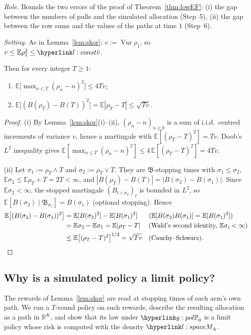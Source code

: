 \documentclass[11pt]{article}
\newcommand{\R}{\mathbb{R}}
\newcommand{\E}{\mathbb{E}}
\newcommand{\1}{\mathbf{1}}
\begin{document}
\begin{lemma}\label{lem:timechange}
\textit{Role.} Bounds the two errors of the proof of Theorem~\ref{thm:lowEF}: (i) the gap between the numbers of pulls and the simulated allocation (Step~5), (ii) the
gap between the row sums and the values of the paths at time $1$ (Step~6).

\noindent\textit{Setting.} As in Lemma~\ref{lem:skor}; $v:=\operatorname{Var}\rho_1$, so $v\le\E\rho_1^2\le\lvb$.

\noindent Then for every integer $T\ge1$:
\begin{enumerate}
\item[(i)] $\E\big[\max_{n\le T}(\rho_n-n)^2\big]\le4Tv$;
\item[(ii)] $\E\big[(B(\rho_T)-B(T))^2\big]=\E|\rho_T-T|\le\sqrt{Tv}$.
\end{enumerate}
\end{lemma}
\begin{proof}
(i) By Lemma~\ref{lem:skor}(i)--(ii), $(\rho_n-n)_{n\ge0}$ is a sum of i.i.d.\ centred increments of variance $v$, hence a martingale with $\E[(\rho_T-T)^2]=Tv$. Doob's
$L^2$ inequality gives $\E[\max_{n\le T}(\rho_n-n)^2]\le4\,\E[(\rho_T-T)^2]=4Tv$.

(ii) Let $\sigma_1:=\rho_T\wedge T$ and $\sigma_2:=\rho_T\vee T$. They are $\mathfrak B$-stopping times with $\sigma_1\le\sigma_2$, $\E\sigma_2\le\E\rho_T+T=2T<\infty$, and
$|B(\rho_T)-B(T)|=|B(\sigma_2)-B(\sigma_1)|$. Since $\E\sigma_2<\infty$, the stopped martingale $(B_{t\wedge\sigma_2})_t$ is bounded in $L^2$, so
$\E[B(\sigma_2)\mid\mathfrak B_{\sigma_1}]=B(\sigma_1)$ (optional stopping). Hence
\begin{align*}
\E\big[(B(\sigma_2)-B(\sigma_1))^2\big]&=\E[B(\sigma_2)^2]-\E[B(\sigma_1)^2] &&\text{(}\E[B(\sigma_2)B(\sigma_1)]=\E[B(\sigma_1)^2]\text{)}\\
&=\E\sigma_2-\E\sigma_1=\E|\rho_T-T| &&\text{(Wald's second identity, }\E\sigma_i<\infty\text{)}\\
&\le\E\big[(\rho_T-T)^2\big]^{1/2}=\sqrt{Tv} &&\text{(Cauchy--Schwarz).}\qedhere
\end{align*}
\end{proof}

\subsection{Why is a simulated policy a limit policy?}\label{sec:app-low-sim}

The rewards of Lemma~\ref{lem:skor} are read at stopping times of each arm's own path. We run a $T$-round policy on such rewards, describe the resulting
allocation as a path in $\R^K$, and show that its law under $\gPh_0$ is a limit policy whose risk is computed with the density $\lM_h$.
\end{document}
